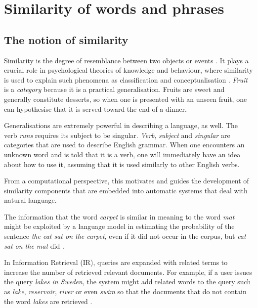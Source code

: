 \chapter{Similarity of words and phrases}
\label{cha:background}

\section{The notion of similarity}
\label{sec:similarity}

Similarity is the degree of resemblance between two objects or events \cite{WCS:WCS1282}. It plays a crucial role in psychological theories of knowledge and behaviour, where similarity is used to explain such phenomena as classification and conceptualisation \cite{Tversky1977,1986-13502-00119860101,medin1993respects,Markman1996,hahn1997concepts}. \textit{Fruit} is a \emph{category} because it is a practical generalisation. Fruits are sweet and generally constitute desserts, so when one is presented with an unseen fruit, one can hypothesise that it is served toward the end of a dinner.

Generalisations are extremely powerful in describing a language, as well. The verb \textit{runs} requires its subject to be singular. \textit{Verb}, \textit{subject} and \textit{singular} are categories that are used to describe English grammar. When one encounters an unknown word and is told that it is a verb, one will immediately have an idea about how to use it, assuming that it is used similarly to other English verbs.

From a computational perspective, this motivates and guides the development of similarity components that are embedded into automatic systems that deal with natural language.

The information that the word \textit{carpet} is similar in meaning to the word \textit{mat} might be exploited by a language model in estimating the probability of the sentence \textit{the cat sat on the carpet}, even if it did not occur in the corpus, but \textit{cat sat on the mat} did \cite{bengio2006}.

In Information Retrieval (IR), queries are expanded with related terms to increase the number of retrieved relevant documents. For example, if a user issues the query \textit{lakes in Sweden}, the system might add related words to the query such as \textit{lake}, \textit{reservoir}, \textit{river} or even \textit{swim} so that the documents that do not contain the word \textit{lakes} are retrieved \cite{Xu:1996:QEU:243199.243202}.

